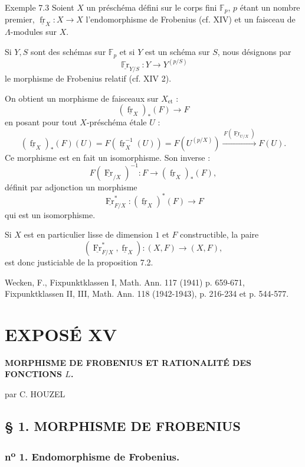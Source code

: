\renewcommand{\fr}{\underline{\operatorname{fr}}}\renewcommand{\Fr}{\underline{\operatorname{Fr}}}
\begin{statement}{Exemple 7.3}
Soient $X$ un préschéma défini sur le corps fini $\mathbb{F}_p$, $p$ étant un nombre premier, $\fr_X:X\to X$ l'endomorphisme de Frobenius (cf. XIV) et un faisceau de $\Lambda$-modules sur $X$.

Si $Y,S$ sont des schémas sur $\mathbb{F}_p$ et si $Y$ est un schéma sur $S$, nous désignons par
\[
\underline{\operatorname{\mathbb{F}r}}_{Y/S}:Y\longrightarrow Y^{(p/S)}
\]
le morphisme de Frobenius relatif (cf. XIV 2).

On obtient un morphisme de faisceaux sur $X_{\mathrm{et}}$ :
\[
(\fr_X)_*(F)\longrightarrow F
\]
en posant pour tout $X$-préschéma étale $U$ :
\[
(\fr_X)_*(F)(U)=F(\fr_X^{-1}(U))=F(U^{(p/X)})
 \xrightarrow{\,F(\Fr_{U/X})\,}F(U).
\]
Ce morphisme est en fait un isomorphisme. Son inverse :
\[
F(\Fr_{/X})^{-1}:F\longrightarrow (\fr_X)_*(F),
\]
définit par adjonction un morphisme
\[
\Fr_{F/X}^*:(\fr_X)^*(F)\longrightarrow F
\]
qui est un isomorphisme.

Si $X$ est en particulier lisse de dimension $1$ et $F$ constructible, la paire
\[
(\Fr_{F/X}^*,\fr_X):(X,F)\longrightarrow (X,F),
\]
est donc justiciable de la proposition 7.2.
\end{statement}

\noindent[1] Wecken, F., Fixpunktklassen I, Math. Ann. 117 (1941) p. 659-671, Fixpunktklassen II, III, Math. Ann. 118 (1942-1943), p. 216-234 et p. 544-577.

\section*{EXPOSÉ XV}
\renewcommand{\fr}{\underline{\underline{\operatorname{fr}}}}\renewcommand{\Fr}{\underline{\underline{\operatorname{Fr}}}}
\begin{center}
\Large\bfseries
MORPHISME DE FROBENIUS ET RATIONALITÉ DES FONCTIONS $L$.

\medskip
par C. HOUZEL
\end{center}

\subsection*{§ 1. MORPHISME DE FROBENIUS}

\subsubsection*{n\textsuperscript{o} 1. Endomorphisme de Frobenius.}

